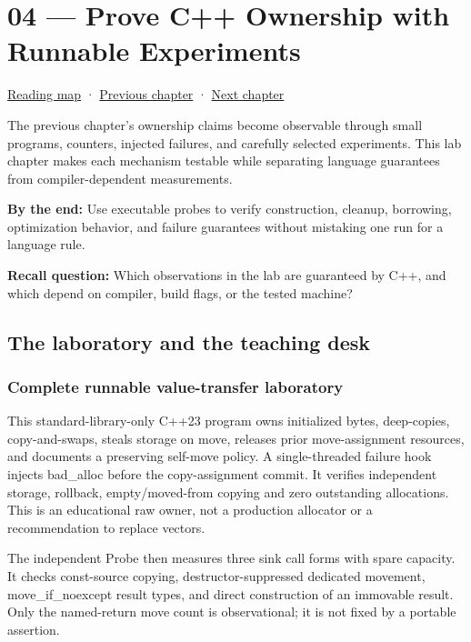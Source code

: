 \hypertarget{01-foundations-i-ch004}{}
\chapter{04 --- Prove C++ Ownership with Runnable Experiments}\label{01-foundations-i-ch004-prove-c-ownership-with-runnable-experiments}

\hyperref[volume-reading-map]{Reading map} · \hyperref[01-foundations-i-ch003-records-as-resource-transactions]{Previous chapter} · \hyperref[01-foundations-i-ch005-generic-asset-pipelines-without-hidden-contracts]{Next chapter}

The previous chapter's ownership claims become observable through small programs, counters, injected failures, and carefully selected experiments. This lab chapter makes each mechanism testable while separating language guarantees from compiler-dependent measurements.

\textbf{By the end:} Use executable probes to verify construction, cleanup, borrowing, optimization behavior, and failure guarantees without mistaking one run for a language rule.

\textbf{Recall question:} Which observations in the lab are guaranteed by C++, and which depend on compiler, build flags, or the tested machine?

\section{The laboratory and the teaching desk}\label{01-foundations-i-ch004-the-laboratory-and-the-teaching-desk}

\subsection{Complete runnable value-transfer laboratory}\label{01-foundations-i-ch004-complete-runnable-value-transfer-laboratory}

This standard-library-only C++23 program owns initialized bytes, deep-copies, copy-and-swaps, steals storage on move, releases prior move-assignment resources, and documents a preserving self-move policy. A single-threaded failure hook injects bad\_alloc before the copy-assignment commit. It verifies independent storage, rollback, empty/moved-from copying and zero outstanding allocations. This is an educational raw owner, not a production allocator or a recommendation to replace vectors.

The independent Probe then measures three sink call forms with spare capacity. It checks const-source copying, destructor-suppressed dedicated movement, move\_if\_noexcept result types, and direct construction of an immovable result. Only the named-return move count is observational; it is not fixed by a portable assertion.

